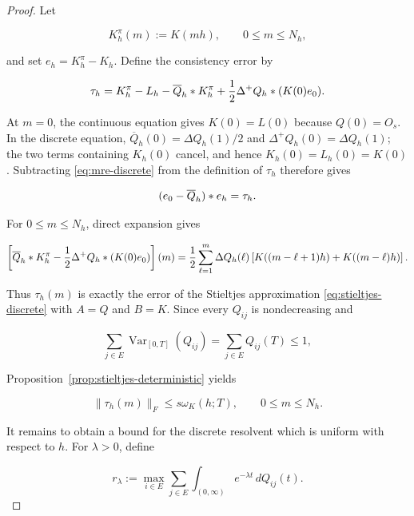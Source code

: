 \documentclass[3p,12pt,authoryear]{elsarticle}
\theoremstyle{definition}
\theoremstyle{remark}
\newcommand{\ez}{e_{\mathstrut 0}}
\begin{document}
\begin{proof}
Let

\begin{equation*}
K_h^{\pi}(m):=K(mh),
\qquad
0\leq m\leq N_h,
\end{equation*}

and set $e_h=K_h^{\pi}-K_h$. Define the consistency error by

\begin{equation*}
\tau_h
=
K_h^{\pi}-L_h-\overline Q_h*K_h^{\pi}
+\frac12\Delta^+Q_h*(K(0)\ez).
\end{equation*}

At $m=0$, the continuous equation gives $K(0)=L(0)$ because $Q(0)=O_s$. In the discrete equation, $\overline Q_h(0)=\Delta Q_h(1)/2$ and $\Delta^+Q_h(0)=\Delta Q_h(1)$; the two terms containing $K_h(0)$ cancel, and hence $K_h(0)=L_h(0)=K(0)$. Subtracting \eqref{eq:mre-discrete} from the definition of $\tau_h$ therefore gives

\begin{equation}\label{eq:error-equation-app}
(\ez-\overline Q_h)*e_h=\tau_h.
\end{equation}

For $0\leq m\leq N_h$, direct expansion gives

\begin{equation*}
\left[
\overline Q_h*K_h^{\pi}
-
\frac12\Delta^+Q_h*(K(0)\ez)
\right](m)
=
\frac12
\sum_{\ell=1}^{m}
\Delta Q_h(\ell)
\left[
K((m-\ell+1)h)+K((m-\ell)h)
\right].
\end{equation*}

Thus $\tau_h(m)$ is exactly the error of the Stieltjes approximation \eqref{eq:stieltjes-discrete} with $A=Q$ and $B=K$. Since every $Q_{ij}$ is nondecreasing and

\begin{equation*}
\sum_{j\in E}\operatorname{Var}_{[0,T]}(Q_{ij})
=
\sum_{j\in E}Q_{ij}(T)
\leq1,
\end{equation*}

Proposition~\ref{prop:stieltjes-deterministic} yields

\begin{equation}\label{eq:local-error-app}
\|\tau_h(m)\|_F
\leq
s\omega_K(h;T),
\qquad
0\leq m\leq N_h.
\end{equation}


It remains to obtain a bound for the discrete resolvent which is uniform with respect to $h$. For $\lambda>0$, define

\begin{equation*}
r_\lambda
:=
\max_{i\in E}
\sum_{j\in E}
\int_{(0,\infty)}e^{-\lambda t}\,dQ_{ij}(t).
\end{equation*}


\end{proof}
\end{document}
